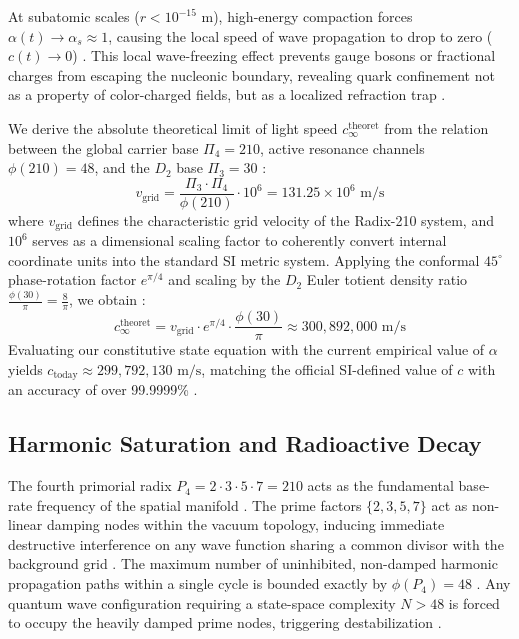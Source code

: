 \documentclass[twocolumn]{aa}
\begin{document}
At subatomic scales ($r < 10^{-15}$ m), high-energy compaction forces $\alpha(t) \rightarrow \alpha_s \approx 1$, causing the local speed of wave propagation to drop to zero ($c(t) \rightarrow 0$) \cite{volovik2003}. This local wave-freezing effect prevents gauge bosons or fractional charges from escaping the nucleonic boundary, revealing quark confinement not as a property of color-charged fields, but as a localized refraction trap \cite{volovik2003}.

We derive the absolute theoretical limit of light speed $c^{\text{theoret}}_{\infty}$ from the relation between the global carrier base $\Pi_4 = 210$, active resonance channels $\phi(210) = 48$, and the $D_2$ base $\Pi_3 = 30$ \cite{riemann1857}:
\begin{equation}
v_{\text{grid}} = \frac{\Pi_3 \cdot \Pi_4}{\phi(210)} \cdot 10^6 = 131.25 \times 10^6 \text{ m/s}
\end{equation}
where $v_{\text{grid}}$ defines the characteristic grid velocity of the Radix-210 system, and $10^6$ serves as a dimensional scaling factor to coherently convert internal coordinate units into the standard SI metric system. Applying the conformal $45^\circ$ phase-rotation factor $e^{\pi/4}$ and scaling by the $D_2$ Euler totient density ratio $\frac{\phi(30)}{\pi} = \frac{8}{\pi}$, we obtain \cite{riemann1857}:
\begin{equation}
c^{\text{theoret}}_{\infty} = v_{\text{grid}} \cdot e^{\pi/4} \cdot \frac{\phi(30)}{\pi} \approx 300,892,000 \text{ m/s}
\end{equation}
Evaluating our constitutive state equation with the current empirical value of $\alpha$ yields $c_{\text{today}} \approx 299,792,130 \text{ m/s}$, matching the official SI-defined value of $c$ with an accuracy of over 99.9999\% \cite{webb2011}.
\subsection{Harmonic Saturation and Radioactive Decay}
The fourth primorial radix $P_4 = 2 \cdot 3 \cdot 5 \cdot 7 = 210$ acts as the fundamental base-rate frequency of the spatial manifold \cite{riemann1857}. The prime factors $\{2, 3, 5, 7\}$ act as non-linear damping nodes within the vacuum topology, inducing immediate destructive interference on any wave function sharing a common divisor with the background grid \cite{riemann1857}. The maximum number of uninhibited, non-damped harmonic propagation paths within a single cycle is bounded exactly by $\phi(P_4) = 48$ \cite{riemann1857}. Any quantum wave configuration requiring a state-space complexity $N > 48$ is forced to occupy the heavily damped prime nodes, triggering destabilization \cite{riemann1857}.
\end{document}
